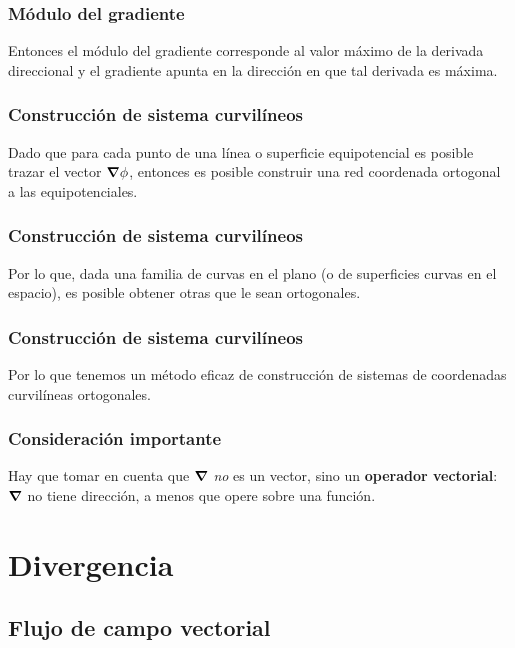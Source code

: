 \documentclass[12pt]{beamer}
\begin{document}
\begin{frame}
\frametitle{Módulo del gradiente}
Entonces el módulo del gradiente corresponde al valor máximo de la derivada direccional y el gradiente apunta en la dirección en que tal derivada es máxima.
\end{frame}
\begin{frame}
\frametitle{Construcción de sistema curvilíneos}
Dado que para cada punto de una línea o superficie equipotencial es posible trazar el vector $\grad{\phi}$, entonces es posible construir una red coordenada ortogonal a las equipotenciales.
\end{frame}
\begin{frame}
\frametitle{Construcción de sistema curvilíneos}
Por lo que, dada una familia de curvas en el plano (o de superficies curvas en el espacio), es posible obtener otras que le sean ortogonales.
\end{frame}
\begin{frame}
\frametitle{Construcción de sistema curvilíneos}
Por lo que tenemos un método eficaz de construcción de sistemas de coordenadas curvilíneas ortogonales.
\end{frame}
\begin{frame}
\frametitle{Consideración importante}
Hay que tomar en cuenta que $\grad$ \emph{no} es un vector, \pause sino un \textbf{operador vectorial}: $\grad$ no tiene dirección, a menos que opere sobre una función.
\end{frame}

\section{Divergencia}
\subsection{Flujo de campo vectorial}
\end{document}
